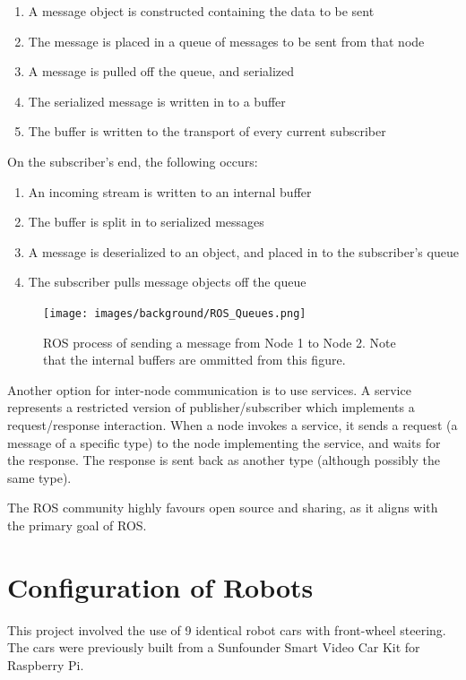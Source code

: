 \documentclass[../dissertation.tex]{subfiles}
\begin{document}
\begin{enumerate}
  \item A message object is constructed containing the data to be sent
  \item The message is placed in a queue of messages to be sent from that node
  \item A message is pulled off the queue, and serialized
  \item The serialized message is written in to a buffer
  \item The buffer is written to the transport of every current subscriber
\end{enumerate}

On the subscriber's end, the following occurs:

\begin{enumerate}
  \item An incoming stream is written to an internal buffer
  \item The buffer is split in to serialized messages
  \item A message is deserialized to an object, and placed in to the subscriber's queue
  \item The subscriber pulls message objects off the queue
\end{enumerate}

\begin{figure}[H]
\centering
\texttt{[image: images/background/ROS\_Queues.png]}
\caption{ROS process of sending a message from Node 1 to Node 2. Note that the internal buffers are ommitted from this figure.}
\end{figure}

Another option for inter-node communication is to use services. A service represents a restricted version of publisher/subscriber which implements a request/response interaction. When a node invokes a service, it sends a request (a message of a specific type) to the node implementing the service, and waits for the response. The response is sent back as another type (although possibly the same type).

The ROS community highly favours open source and sharing, as it aligns with the primary goal of ROS.

\section{Configuration of Robots}
\label{background-robot-config}

This project involved the use of 9 identical robot cars with front-wheel steering. The cars were previously built from a Sunfounder Smart Video Car Kit for Raspberry Pi\cite{SunfounderRobotCarKit}.
\end{document}
